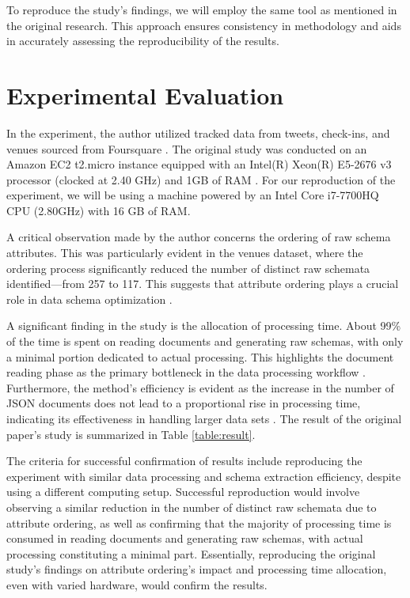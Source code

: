 \documentclass[sigconf, nonacm]{acmart}
\begin{document}
To reproduce the study's findings, we will employ the same tool as mentioned in the original research. This approach ensures consistency in methodology and aids in accurately assessing the reproducibility of the results.

\section{Experimental Evaluation}

In the experiment, the author utilized tracked data from tweets, check-ins, and venues sourced from Foursquare \cite{ccelikten2016modeling}. The original study was conducted on an Amazon EC2 t2.micro instance equipped with an Intel(R) Xeon(R) E5-2676 v3 processor (clocked at 2.40 GHz) and 1GB of RAM \cite{frozza2018approach}. For our reproduction of the experiment, we will be using a machine powered by an Intel Core i7-7700HQ CPU (2.80GHz) with 16 GB of RAM. 

A critical observation made by the author concerns the ordering of raw schema attributes. This was particularly evident in the venues dataset, where the ordering process significantly reduced the number of distinct raw schemata identified—from 257 to 117. This suggests that attribute ordering plays a crucial role in data schema optimization \cite{frozza2018approach}. 

A significant finding in the study is the allocation of processing time. About 99\% of the time is spent on reading documents and generating raw schemas, with only a minimal portion dedicated to actual processing. This highlights the document reading phase as the primary bottleneck in the data processing workflow \cite{frozza2018approach}. Furthermore, the method's efficiency is evident as the increase in the number of JSON documents does not lead to a proportional rise in processing time, indicating its effectiveness in handling larger data sets \cite{frozza2018approach}. The result of the original paper's \cite{frozza2018approach} study is summarized in Table \ref{table:result}.

The criteria for successful confirmation of results include reproducing the experiment with similar data processing and schema extraction efficiency, despite using a different computing setup. Successful reproduction would involve observing a similar reduction in the number of distinct raw schemata due to attribute ordering, as well as confirming that the majority of processing time is consumed in reading documents and generating raw schemas, with actual processing constituting a minimal part. Essentially, reproducing the original study's findings on attribute ordering's impact and processing time allocation, even with varied hardware, would confirm the results.
\end{document}
